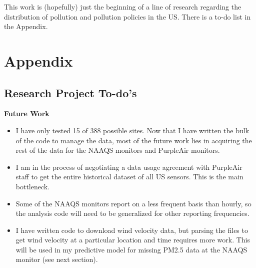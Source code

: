 \documentclass[12pt]{article}
\begin{document}
This work is (hopefully) just the beginning of a line of research regarding the distribution of pollution and pollution policies in the US. There is a to-do list in the Appendix.











\newpage


% 
%



\newpage
\section{Appendix}

\subsection{Research Project To-do's} \label{sec:todo}

\textbf{Future Work}
\begin{itemize}
    \item I have only tested 15 of 388 possible sites. Now that I have written the bulk of the code to manage the data, most of the future work lies in acquiring the rest of the data for the NAAQS monitors and PurpleAir monitors.
    \item I am in the process of negotiating a data usage agreement with PurpleAir staff to get the entire historical dataset of all US sensors. This is the main bottleneck.
    \item Some of the NAAQS monitors report on a less frequent basis than hourly, so the analysis code will need to be generalized for other reporting frequencies.
    \item I have written code to download wind velocity data, but parsing the files to get wind velocity at a particular location and time requires more work. This will be used in my predictive model for missing PM2.5 data at the NAAQS monitor (see next section).
\end{itemize}
\end{document}
